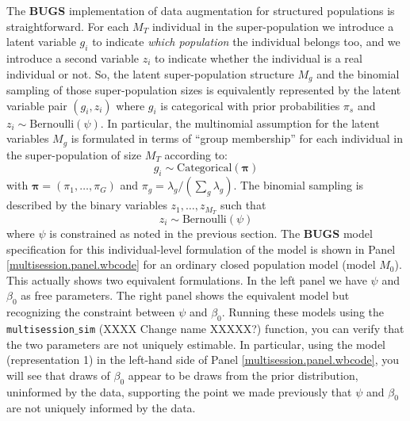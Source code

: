 The {\bf BUGS} implementation of data augmentation for structured
populations is straightforward.
For each $M_{T}$ %
individual in the
super-population we introduce a latent variable $g_{i}$ to indicate
{\it which population} the individual belongs too, and we introduce a second
variable $z_{i}$ to indicate whether the individual is a real
individual or not.  So, the latent super-population structure $M_{g}$
and the binomial sampling of those super-population sizes is
equivalently represented by the latent variable pair $(g_{i},z_{i})$
where $g_{i}$ is categorical with prior probabilities $\pi_{s}$ and
$z_{i} \sim \mbox{Bernoulli}(\psi)$.  In particular,
the multinomial assumption
for the latent variables $M_{g}$ is formulated in terms of ``group
membership'' for each individual in the super-population of size $M_{T}$
according to:
\[
 g_{i} \sim \mbox{Categorical}\left( {\bm \pi} \right)
\]
with ${\bm \pi} = (\pi_{1}, \ldots, \pi_{G})$ and $\pi_{g} =
\lambda_{g}/(\sum_{g} \lambda_{g})$.  The binomial sampling is
described by the binary variables $z_{1},\ldots,z_{M_{T}}$ such that
\[
 z_{i} \sim \mbox{Bernoulli}(\psi)
\]
where $\psi$ is constrained as noted in the previous section.  The
{\bf BUGS} model specification for this individual-level formulation
of the model is shown in Panel \ref{multisession.panel.wbcode} for an ordinary
closed population model (model $M_{0}$).  This actually shows two
equivalent formulations. In the left panel we have $\psi$ and
$\beta_{0}$ as free parameters.  The right panel shows the equivalent
model but recognizing the constraint between $\psi$ and $\beta_{0}$.
Running these models using the \mbox{\tt multisession$\_$sim} (XXXX
Change name XXXXX?)
function, you can verify that the two parameters are not uniquely estimable. In
particular,
 using the model
(representation 1) in the left-hand side of Panel \ref{multisession.panel.wbcode},
you will see that
draws of $\beta_{0}$
 appear to be draws from the prior distribution,
uninformed by the data, supporting the point we made previously that
$\psi$ and $\beta_0$ are not uniquely informed by the data.

